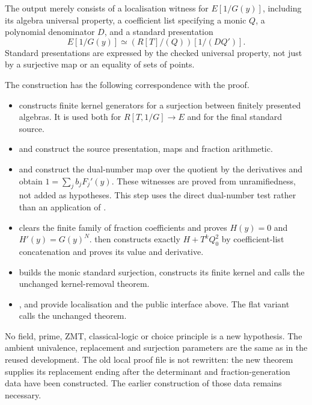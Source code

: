 \documentclass[11pt]{article}
\begin{document}
The output merely consists of a localisation witness for $E[1/G(y)]$,
including its algebra universal property, a coefficient list specifying
a monic $Q$, a polynomial denominator $D$, and a standard presentation
\[
                 E[1/G(y)]\simeq(R[T]/(Q))[1/(DQ')].
\]
Standard presentations are expressed by the checked
 universal property, not just
by a surjective map or an equality of sets of points.

The construction has the following correspondence with the proof.
\begin{itemize}
\item {} constructs finite kernel
generators for a surjection between finitely presented algebras.
It is used both for $R[T,1/G]\to E$ and for the final standard source.
\item {} and
 construct the source presentation,
maps and fraction arithmetic.
\item {} and
 construct the dual-number map
over the quotient by the derivatives and obtain
$1=\sum_j b_jF_j'(y)$. These witnesses are proved from unramifiedness,
not added as hypotheses. This step uses the direct dual-number test
rather than an application of .
\item {} clears the finite family
of fraction coefficients and proves $H(y)=0$ and $H'(y)=G(y)^N$.
 then constructs exactly $H+T^kQ_0^2$ by
coefficient-list concatenation and proves its value and derivative.
\item {} builds the monic standard
surjection, constructs its finite kernel and calls the unchanged
 kernel-removal theorem.
\item {},
 and 
provide localisation and the public interface above. The flat variant
calls the unchanged  theorem.
\end{itemize}

No field, prime, ZMT, classical-logic or choice principle is a new
hypothesis. The ambient univalence, replacement and surjection
parameters are the same as in the reused development. The old local
proof file is not rewritten: the new theorem supplies its replacement
ending after the determinant and fraction-generation data have been
constructed. The earlier construction of those data remains necessary.
\end{document}

